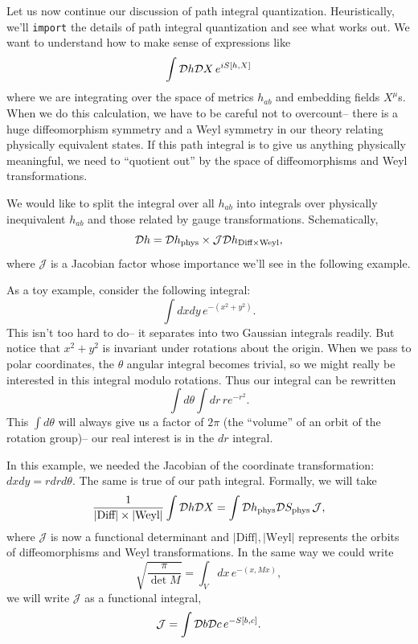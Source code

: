 Let us now continue our discussion of path integral quantization. Heuristically, we'll \verb|import| the details of path integral quantization and see what works out. We want to understand how to make sense of expressions like
\begin{equation}
    \int \mathcal{D} h \mathcal{D} X \,e^{iS[h,X]}
\end{equation}
where we are integrating over the space of metrics $h_{ab}$ and embedding fields $X^\mu$s. When we do this calculation, we have to be careful not to overcount-- there is a huge diffeomorphism symmetry and a Weyl symmetry in our theory relating physically equivalent states. If this path integral is to give us anything physically meaningful, we need to ``quotient out'' by the space of diffeomorphisms and Weyl transformations.

We would like to split the integral over all $h_{ab}$ into integrals over physically inequivalent $h_{ab}$ and those related by gauge transformations. Schematically,
\begin{equation}
    \mathcal{D} h = \mathcal{D} h_{\text{phys}}\times \mathcal{J}\mathcal{D} h_{\text{Diff}\times \text{Weyl}},
\end{equation}
where $\mathcal{J}$ is a Jacobian factor whose importance we'll see in the following example.

\begin{exm}
    As a toy example, consider the following integral:
    \begin{equation*}
        \int dxdy\, e^{-(x^2 +y^2)}.
    \end{equation*}
    This isn't too hard to do-- it separates into two Gaussian integrals readily. But notice that $x^2+y^2$ is invariant under rotations about the origin. When we pass to polar coordinates, the $\theta$ angular integral becomes trivial, so we might really be interested in this integral modulo rotations. Thus our integral can be rewritten
    \begin{equation*}
        \int d\theta \int dr \, re^{-r^2}.
    \end{equation*}
    This $\int d\theta$ will always give us a factor of $2\pi$ (the  ``volume'' of an orbit of the rotation group)-- our real interest is in the $dr$ integral.
\end{exm}

In this example, we needed the Jacobian of the coordinate transformation: $dxdy=rdr d\theta$. The same is true of our path integral. Formally, we will take
\begin{equation}
    \frac{1}{|\text{Diff}|\times |\text{Weyl}|}\int \mathcal{D} h \mathcal{D} X = \int \mathcal{D} h_{\text{phys}}\mathcal{D} S_{\text{phys}} \,\mathcal{J},
\end{equation}
where $\mathcal{J}$ is now a functional determinant and $|\text{Diff}|, |\text{Weyl}|$ represents the orbits of diffeomorphisms and Weyl transformations.
%
In the same way we could write
\begin{equation}
    \sqrt{\frac{\pi}{\det M}}=\int_V dx \,e^{-(x,Mx)},
\end{equation}
we will write $\mathcal{J}$ as a functional integral,
\begin{equation}
    \mathcal J =\int \mathcal{D} b \mathcal{D} c\, e^{-S[b,c]}.
\end{equation}

